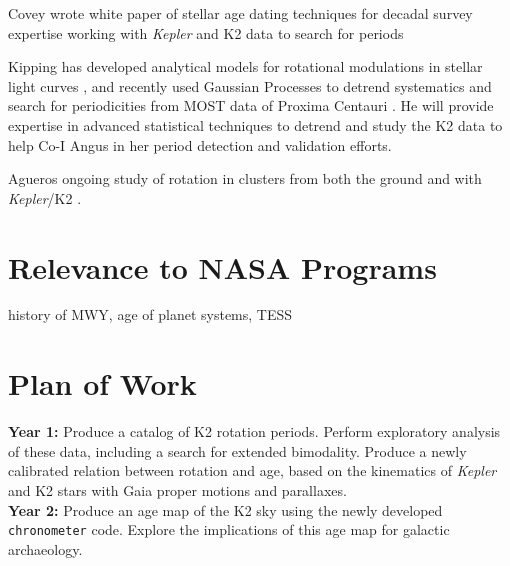 \documentclass[12pt]{article}
\newcommand{\Kepler}{\textsl{Kepler}\xspace}
\begin{document}
Covey
wrote white paper of stellar age dating techniques  for decadal survey \citep{covey2010white}
expertise working with \Kepler and K2 data to search for periods \citep{douglas2016,covey2016}

Kipping
has developed analytical models for rotational modulations in stellar light curves \citep{kipping2012}, and recently used Gaussian Processes to detrend systematics and search for periodicities from MOST data of Proxima Centauri \citep{kippingmost}. He will provide expertise in advanced statistical techniques to detrend and study the K2 data to help Co-I Angus in her period detection and validation efforts.

Agueros
ongoing study of rotation in clusters from both the ground \citep{agueros2011} and with \Kepler/K2 \citet{douglas2016,douglas2017,nunez2017}.




\section{Relevance to NASA Programs}
history of MWY, age of planet systems, TESS



\section{Plan of Work}
{\bf Year 1:} Produce a catalog of K2 rotation periods. Perform exploratory
analysis of these data, including a search for extended bimodality.
Produce a newly calibrated relation between rotation and age,
based on the kinematics of \Kepler and K2 stars with Gaia proper motions and
parallaxes.
\\
{\bf Year 2:} Produce an age map of the K2 sky using the newly developed 
{\tt chronometer} code.
Explore the implications of this age map for galactic archaeology.


\clearpage


\end{document}
